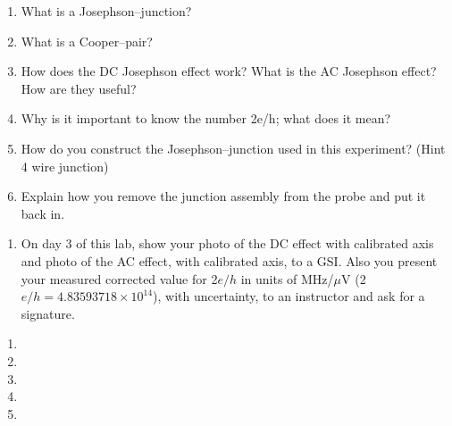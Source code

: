 \documentclass{../signatures}
\begin{document}
\maketitle

\names

\prelab

\begin{enumerate}

    \item What is a Josephson–junction?
    
    \item What is a Cooper–pair?

    \item How does the DC Josephson effect work? What is the AC Josephson effect? How are they useful?

    \item Why is it important to know the number 2e/h; what does it mean?

    \item How do you construct the Josephson–junction used in this experiment? (Hint 4 wire junction)

    \item Explain how you remove the junction assembly from the probe and put it back in.
       \\[36pt]
\end{enumerate}

\prelabsignatures

\midlab

\begin{enumerate}

    \item On day 3 of this lab, show your photo of the DC effect with calibrated axis and photo of the AC effect, with calibrated axis, to a GSI. Also you present your measured corrected value for 2$e/h$ in units of MHz/$\mu$V (2$e/h= 4.83593718 \times 10^{14}$), with uncertainty, to an instructor and ask for a signature.
\\[36pt]
\end{enumerate}


\checkpointsection 

\begin{enumerate}

\item {}

\item {}

\item {}

\item {}

\item {}

\end{enumerate}
\end{document}
